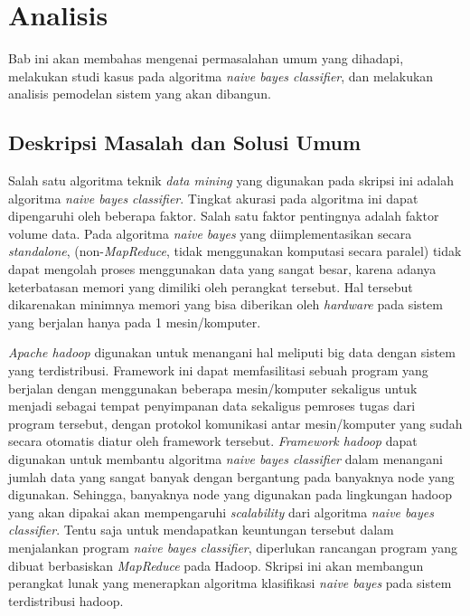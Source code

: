 \chapter{Analisis}

Bab ini akan membahas mengenai permasalahan umum yang dihadapi, melakukan studi kasus pada algoritma \textit{naive bayes classifier}, dan melakukan analisis pemodelan sistem yang akan dibangun.

\section{Deskripsi Masalah dan Solusi Umum}
Salah satu algoritma teknik \textit{data mining} yang digunakan pada skripsi ini adalah algoritma \textit{naive bayes classifier}. Tingkat akurasi pada algoritma ini dapat dipengaruhi oleh beberapa faktor. Salah satu faktor pentingnya adalah faktor volume data. Pada algoritma \textit{naive bayes} yang diimplementasikan secara \textit{standalone}, (non-\textit{MapReduce}, tidak menggunakan komputasi secara paralel) tidak dapat mengolah proses menggunakan data yang sangat besar, karena adanya keterbatasan memori yang dimiliki oleh perangkat tersebut. Hal tersebut dikarenakan minimnya memori yang bisa diberikan oleh \textit{hardware} pada sistem yang berjalan hanya pada 1 mesin/komputer.

\textit{Apache hadoop} digunakan untuk menangani hal meliputi big data dengan sistem yang terdistribusi. Framework ini dapat memfasilitasi sebuah program yang berjalan dengan menggunakan beberapa mesin/komputer sekaligus untuk menjadi sebagai tempat penyimpanan data sekaligus pemroses tugas dari program tersebut, dengan protokol komunikasi antar mesin/komputer yang sudah secara otomatis diatur oleh framework tersebut. \textit{Framework hadoop} dapat digunakan untuk membantu algoritma \textit{naive bayes classifier} dalam menangani jumlah data yang sangat banyak dengan bergantung pada banyaknya node yang digunakan. Sehingga, banyaknya node yang digunakan pada lingkungan hadoop yang akan dipakai akan mempengaruhi \textit{scalability} dari algoritma \textit{naive bayes classifier}. Tentu saja untuk mendapatkan keuntungan tersebut dalam menjalankan program \textit{naive bayes classifier}, diperlukan rancangan program yang dibuat berbasiskan \textit{MapReduce} pada Hadoop. Skripsi ini akan membangun perangkat lunak yang menerapkan algoritma klasifikasi \textit{naive bayes} pada sistem terdistribusi hadoop.


